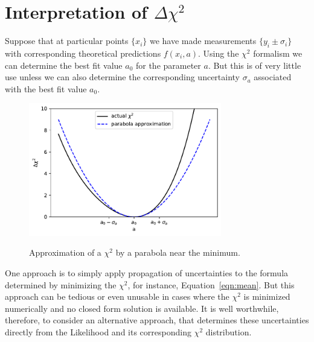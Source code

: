 \documentclass[12pt,oneside]{book}
\begin{document}
\section{Interpretation of $\Delta \chi^2$}

Suppose that at particular points $\{x_i\}$ we have made measurements
$\{y_i \pm \sigma_i\}$ with corresponding theoretical predictions
$f(x_i, a)$.  Using the $\chi^2$ formalism we can determine the best
fit value $a_0$ for the parameter $a$.  But this is of very little use
unless we can also determine the corresponding uncertainty $\sigma_a$
associated with the best fit value $a_0$.

\begin{figure}[htbp]
\begin{center}
{\includegraphics[width=0.75\textwidth]{figs/delchisq.pdf}}
\end{center}
\caption{\label{fig:delchisq} Approximation of a $\chi^2$ by a parabola near the minimum.}
\end{figure}

One approach is to simply apply propagation of uncertainties to the
formula determined by minimizing the $\chi^2$, for instance,
Equation~\ref{eqn:mean}.  But this approach can be tedious or even
unusable in cases where the $\chi^2$ is minimized numerically and no
closed form solution is available.  It is well worthwhile, therefore,
to consider an alternative approach, that determines these
uncertainties directly from the Likelihood and its corresponding
$\chi^2$ distribution.
\end{document}
